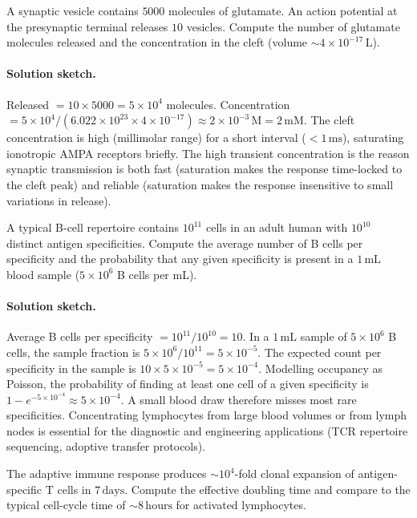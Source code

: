 \begin{exercise}
A synaptic vesicle contains $5000$ molecules of glutamate. An action
potential at the presynaptic terminal releases $10$ vesicles. Compute
the number of glutamate molecules released and the concentration in
the cleft (volume $\sim 4 \times 10^{-17}\,\text{L}$).
\end{exercise}

\paragraph{Solution sketch.}
Released $= 10 \times 5000 = 5 \times 10^4$ molecules. Concentration
$= 5 \times 10^4 / (6.022 \times 10^{23} \times 4 \times 10^{-17})
\approx 2 \times 10^{-3}\,\text{M} = 2\,\text{mM}$. The cleft
concentration is high (millimolar range) for a short interval
($< 1\,\text{ms}$), saturating ionotropic AMPA receptors briefly. The
high transient concentration is the reason synaptic transmission is
both fast (saturation makes the response time-locked to the cleft
peak) and reliable (saturation makes the response insensitive to small
variations in release).

\begin{exercise}
A typical B-cell repertoire contains $10^{11}$ cells in an adult human
with $10^{10}$ distinct antigen specificities. Compute the average
number of B cells per specificity and the probability that any given
specificity is present in a $1\,\text{mL}$ blood sample
($5 \times 10^6$ B cells per mL).
\end{exercise}

\paragraph{Solution sketch.}
Average B cells per specificity $= 10^{11} / 10^{10} = 10$. In a
$1\,\text{mL}$ sample of $5 \times 10^6$ B cells, the sample fraction
is $5 \times 10^6 / 10^{11} = 5 \times 10^{-5}$. The expected count
per specificity in the sample is $10 \times 5 \times 10^{-5} =
5 \times 10^{-4}$. Modelling occupancy as Poisson, the probability of
finding at least one cell of a given specificity is
$1 - e^{-5 \times 10^{-4}} \approx 5 \times 10^{-4}$. A small blood
draw therefore misses most rare specificities. Concentrating
lymphocytes from large blood volumes or from lymph nodes is essential
for the diagnostic and engineering applications (TCR repertoire
sequencing, adoptive transfer protocols).

\begin{exercise}
The adaptive immune response produces $\sim 10^4$-fold clonal
expansion of antigen-specific T cells in $7\,\text{days}$. Compute
the effective doubling time and compare to the typical cell-cycle
time of $\sim 8\,\text{hours}$ for activated lymphocytes.
\end{exercise}

